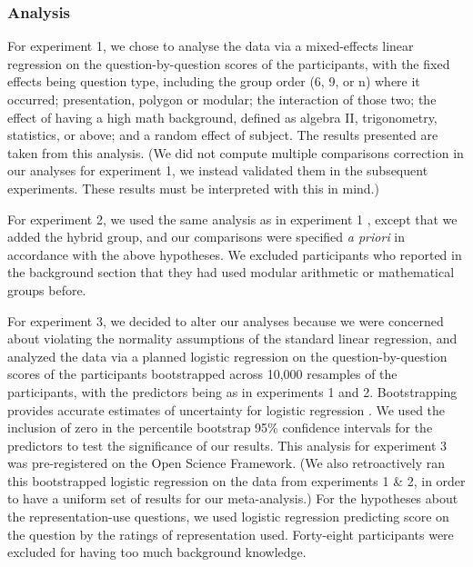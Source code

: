 \documentclass[man,10pt]{apa6}
\begin{document}
\subsubsection{Analysis}
For experiment 1, we chose to analyse the data via a mixed-effects linear regression on the question-by-question scores of the participants, with the fixed effects being question type, including the group order (6, 9, or n) where it occurred; presentation, polygon or modular; the interaction of those two; the effect of having a high math background, defined as algebra II, trigonometry, statistics, or above; and a random effect of subject. The results presented are taken from this analysis. (We did not compute multiple comparisons correction in our analyses for experiment 1, we instead validated them in the subsequent experiments. These results must be interpreted with this in mind.) \par 
For experiment 2, we used the same analysis as in experiment 1 , except that we added the hybrid group, and our comparisons were specified \textit{a priori} in accordance with the above hypotheses. We excluded  participants who reported in the background section that they had used modular arithmetic or mathematical groups before. \par
For experiment 3, we decided to alter our analyses because we were concerned about violating the normality assumptions of the standard linear regression, and analyzed the data via a planned logistic regression on the question-by-question scores of the participants bootstrapped across 10,000 resamples of the participants, with the predictors being as in experiments 1 and 2. Bootstrapping provides accurate estimates of uncertainty for logistic regression \cite{Wasserman2006,Gong1986}. We used the inclusion of zero in the percentile bootstrap 95\% confidence intervals for the predictors to test the significance of our results. This analysis for experiment 3 was pre-registered on the Open Science Framework.
(We also retroactively ran this bootstrapped logistic regression on the data from experiments 1 \& 2, in order to have a uniform set of results for our meta-analysis.) For the hypotheses about the representation-use questions, we used logistic regression predicting score on the question by the ratings of representation used. Forty-eight participants were excluded for having too much background knowledge.
\end{document}
